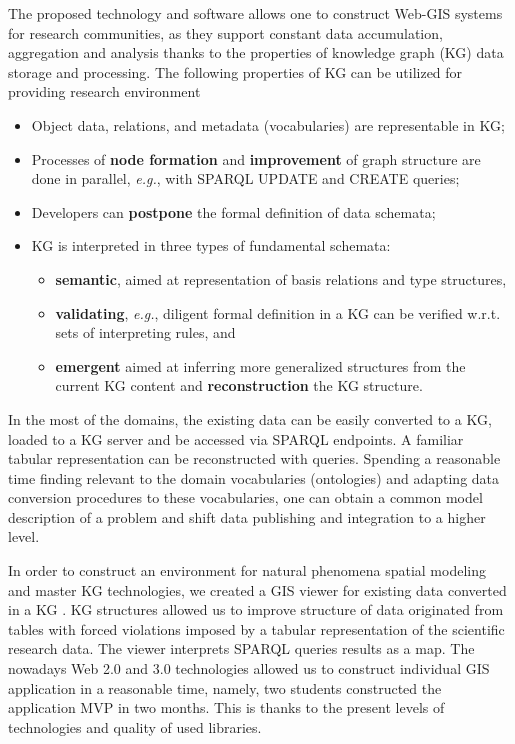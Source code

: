 \documentclass[
]{ceurart}
\begin{document}
The proposed technology and software allows one to construct Web-GIS systems for research communities, as they support constant data accumulation, aggregation and analysis thanks to the properties of knowledge graph (KG) data storage and processing.  The following properties of KG can be utilized for providing research environment
 \begin{itemize}
  \item Object data, relations, and metadata (vocabularies) are representable in KG;
  \item Processes of \textbf{node formation} and \textbf{improvement} of graph structure are done in parallel, \emph{e.g.}, with SPARQL UPDATE and CREATE queries;
  \item Developers can \textbf{postpone} the formal definition of data schemata;
  \item KG is interpreted in three types of fundamental schemata:
    \begin{itemize}
    \item \textbf{semantic}, aimed at representation of basis relations and type structures,
    \item \textbf{validating}, \emph{e.g.}, diligent formal definition in a KG can be verified w.r.t. sets of interpreting rules, and
    \item \textbf{emergent} aimed at inferring more generalized structures from the current KG content and \textbf{reconstruction} the KG structure.
    \end{itemize}
  \end{itemize}

In the most of the domains, the existing data can be easily converted to a KG, loaded to a KG server and be accessed via SPARQL endpoints.  A familiar tabular representation can be reconstructed with queries.  Spending a reasonable time finding relevant to the domain vocabularies (ontologies) and adapting data conversion procedures to these vocabularies, one can obtain a common model description of a problem and shift data publishing and integration to a higher level.

In order to construct an environment for natural phenomena spatial modeling and master KG technologies, we created a GIS viewer for existing data converted in a KG \cite{lunina,afs}.  KG structures allowed us to improve structure of data originated from tables with forced violations imposed by a tabular representation of the scientific research data.  The viewer interprets SPARQL queries results as a map.   The nowadays Web 2.0 and 3.0 technologies allowed us to construct individual GIS application in a reasonable time, namely, two students constructed the application MVP in two months.  This is thanks to the present levels of technologies and quality of used libraries.
\end{document}

